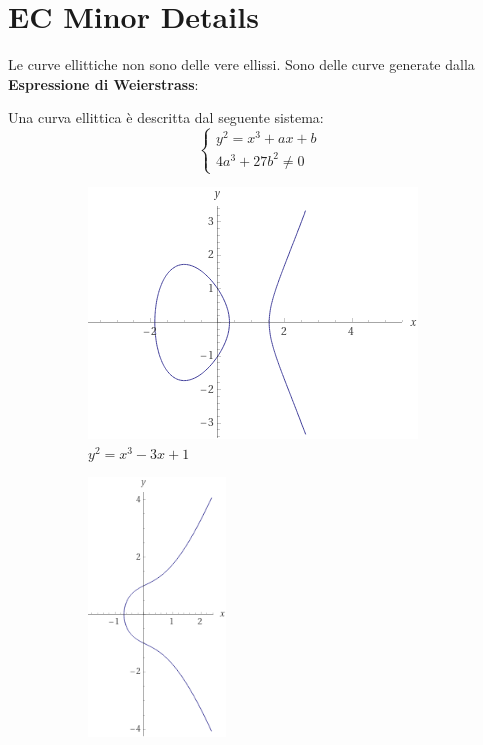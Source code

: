 \section{EC Minor Details}
Le curve ellittiche non sono delle vere ellissi. Sono delle curve generate dalla \textbf{Espressione di Weierstrass}:
\begin{definition}\label{def:weiereq}
Una curva ellittica è descritta dal seguente sistema:
\begin{equation}\label{eq:weiereq}
    \begin{cases}
    y^2=x^3+ax+b\\
    4a^3+27b^2\ne0
    \end{cases}
\end{equation}
\end{definition}
\begin{figure}[h]
\vspace{-10pt}
     \centering
     \begin{subfigure}[b]{0.3\textwidth}
         \centering
         \includegraphics[width=\textwidth]{image/ecc/ec1.png}
         \caption{$y^2=x^3-3x+1$}
         \label{fig:ec1}
     \end{subfigure}
     \hfill
     \begin{subfigure}[b]{0.3\textwidth}
         \centering
         \includegraphics[width=0.4\textwidth]{image/ecc/ec2.png}

\end{subfigure}
\end{figure}

